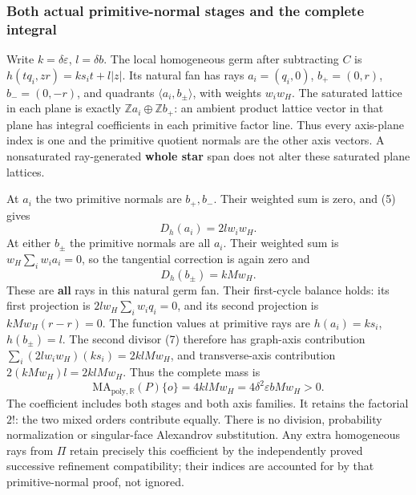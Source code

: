 \documentclass[
  11pt,
]{article}
\begin{document}
\subsubsection{Both actual primitive-normal stages and the complete
integral}\label{both-actual-primitive-normal-stages-and-the-complete-integral}

Write \(k=\delta\varepsilon\), \(l=\delta b\). The local homogeneous
germ after subtracting \(C\) is \(h(tq_i,zr)=ks_it+l|z|\). Its natural
fan has rays \(a_i=(q_i,0)\), \(b_+=(0,r)\), \(b_-=(0,-r)\), and
quadrants \(\langle a_i,b_\pm\rangle\), with weights \(w_iw_H\). The
saturated lattice in each plane is exactly
\(\mathbb Za_i\oplus\mathbb Zb_+\): an ambient product lattice vector in
that plane has integral coefficients in each primitive factor line. Thus
every axis-plane index is one and the primitive quotient normals are the
other axis vectors. A nonsaturated ray-generated \textbf{whole star}
span does not alter these saturated plane lattices.

At \(a_i\) the two primitive normals are \(b_+,b_-\). Their weighted sum
is zero, and (5) gives \[
                       D_h(a_i)=2l w_iw_H.                 \tag{HR17}
\] At either \(b_\pm\) the primitive normals are all \(a_i\). Their
weighted sum is \(w_H\sum_iw_i a_i=0\), so the tangential correction is
again zero and \[
                       D_h(b_\pm)=kMw_H.                  \tag{HR18}
\] These are \textbf{all} rays in this natural germ fan. Their
first-cycle balance holds: its first projection is
\(2lw_H\sum_iw_iq_i=0\), and its second projection is \(kMw_H(r-r)=0\).
The function values at primitive rays are \(h(a_i)=ks_i\),
\(h(b_\pm)=l\). The second divisor (7) therefore has graph-axis
contribution \(\sum_i(2lw_iw_H)(ks_i)=2klMw_H\), and transverse-axis
contribution \(2(kMw_H)l=2klMw_H\). Thus the complete mass is \[
 \mathrm{MA}_{\mathrm{poly},\mathbb{R}}(P)\{o\}
       =4klMw_H=4\delta^2\varepsilon bMw_H>0.                \tag{HR19}
\] The coefficient includes both stages and both axis families. It
retains the factorial \(2!\): the two mixed orders contribute equally.
There is no division, probability normalization or singular-face
Alexandrov substitution. Any extra homogeneous rays from \(\Pi\) retain
precisely this coefficient by the independently proved successive
refinement compatibility; their indices are accounted for by that
primitive-normal proof, not ignored.
\end{document}
